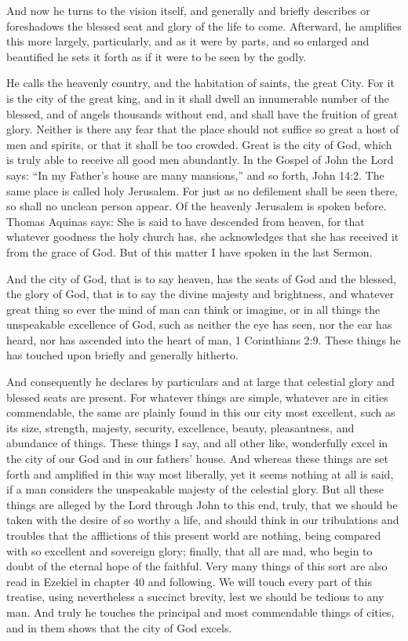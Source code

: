 And now he turns to the vision itself, and generally and briefly describes or foreshadows the blessed seat and glory of the life to come. Afterward, he amplifies this more largely, particularly, and as it were by parts, and so enlarged and beautified he sets it forth as if it were to be seen by the godly.

He calls the heavenly country, and the habitation of saints, the great City. For it is the city of the great king, and in it shall dwell an innumerable number of the blessed, and of angels thousands without end, and shall have the fruition of great glory. Neither is there any fear that the place should not suffice so great a host of men and spirits, or that it shall be too crowded. Great is the city of God, which is truly able to receive all good men abundantly. In the Gospel of John the Lord says: “In my Father’s house are many mansions,” and so forth, John 14:2. The same place is called holy Jerusalem. For just as no defilement shall be seen there, so shall no unclean person appear. Of the heavenly Jerusalem is spoken before. Thomas Aquinas says: She is said to have descended from heaven, for that whatever goodness the holy church has, she acknowledges that she has received it from the grace of God. But of this matter I have spoken in the last Sermon.

And the city of God, that is to say heaven, has the seats of God and the blessed, the glory of God, that is to say the divine majesty and brightness, and whatever great thing so ever the mind of man can think or imagine, or in all things the unspeakable excellence of God, such as neither the eye has seen, nor the ear has heard, nor has ascended into the heart of man, 1 Corinthians 2:9. These things he has touched upon briefly and generally hitherto.

And consequently he declares by particulars and at large that celestial glory and blessed seats are present. For whatever things are simple, whatever are in cities commendable, the same are plainly found in this our city most excellent, such as its size, strength, majesty, security, excellence, beauty, pleasantness, and abundance of things. These things I say, and all other like, wonderfully excel in the city of our God and in our fathers’ house. And whereas these things are set forth and amplified in this way most liberally, yet it seems nothing at all is said, if a man considers the unspeakable majesty of the celestial glory. But all these things are alleged by the Lord through John to this end, truly, that we should be taken with the desire of so worthy a life, and should think in our tribulations and troubles that the afflictions of this present world are nothing, being compared with so excellent and sovereign glory; finally, that all are mad, who begin to doubt of the eternal hope of the faithful. Very many things of this sort are also read in Ezekiel in chapter 40 and following. We will touch every part of this treatise, using nevertheless a succinct brevity, lest we should be tedious to any man. And truly he touches the principal and most commendable things of cities, and in them shows that the city of God excels.

